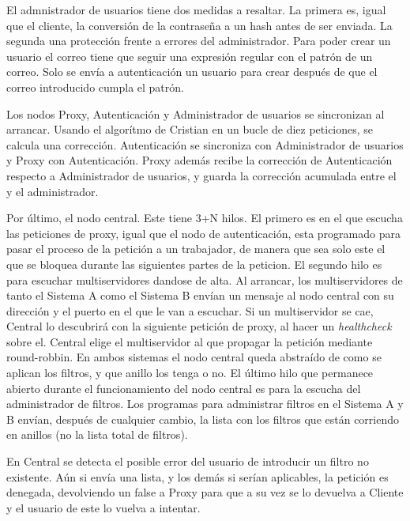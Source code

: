 \documentclass{article}
\begin{document}
\begin{flushleft}
		El admnistrador de usuarios tiene dos medidas a resaltar. La primera es, igual que el cliente, la conversión de la contraseña a un hash antes de ser enviada. La segunda una protección frente a errores del administrador. Para poder crear un usuario el correo tiene que seguir una expresión regular con el patrón de un correo. Solo se envía a autenticación un usuario para crear después de que el correo introducido cumpla el patrón.
		\linebreak
		
		Los nodos Proxy, Autenticación y Administrador de usuarios se sincronizan al arrancar. Usando el algorítmo de Cristian en un bucle de diez peticiones, se calcula una corrección. Autenticación se sincroniza con Administrador de usuarios y Proxy con Autenticación. Proxy además recibe la corrección de Autenticación respecto a Administrador de usuarios, y guarda la corrección acumulada entre el y el administrador.
		\linebreak
		
		Por último, el nodo central. Este tiene 3+N hilos. El primero es en el que escucha las peticiones de proxy, igual que el nodo de autenticación, esta programado para pasar el proceso de la petición a un trabajador, de manera que sea solo este el que se bloquea durante las siguientes partes de la peticion. El segundo hilo es para escuchar multiservidores dandose de alta. Al arrancar, los multiservidores de tanto el Sistema A como el Sistema B envían un mensaje al nodo central con su dirección y el puerto en el que le van a escuchar. Si un multiservidor se cae, Central lo descubrirá con la siguiente petición de proxy, al hacer un \textit{healthcheck} sobre el. Central elige el multiservidor al que propagar la petición mediante round-robbin. En ambos sistemas el nodo central queda abstraído de como se aplican los filtros, y que anillo los tenga o no. El último hilo que permanece abierto durante el funcionamiento del nodo central es para la escucha del administrador de filtros. Los programas para administrar filtros en el Sistema A y B envían, después de cualquier cambio, la lista con los filtros que están corriendo en anillos (no la lista total de filtros). 
		\linebreak
		
		En Central se detecta el posible error del usuario de introducir un filtro no existente. Aún si envía una lista, y los demás si serían aplicables, la petición es denegada, devolviendo un false a Proxy para que a su vez se lo devuelva a Cliente y el usuario de este lo vuelva a intentar.
		\linebreak
		

\end{flushleft}
\end{document}
